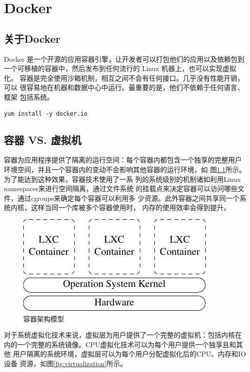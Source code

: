\chapter{Docker}

\section{关于Docker}

Docker 是一个开源的应用容器引擎，让开发者可以打包他们的应用以及依赖包到
一个可移植的容器中，然后发布到任何流行的 Linux 机器上，也可以实现虚拟化。
容器是完全使用沙箱机制，相互之间不会有任何接口。几乎没有性能开销，可以
很容易地在机器和数据中心中运行。最重要的是，他们不依赖于任何语言、框架
包括系统。

\begin{verbatim}
yum install -y docker.io
\end{verbatim}

\section{容器 VS. 虚拟机}

容器为应用程序提供了隔离的运行空间：每个容器内都包含一个独享的完整用户
环境空间，并且一个容器内的变动不会影响其他容器的运行环境，如
图\ref{fig:container}所示。为了能达到这种效果，容器技术使用了一系
列的系统级别的机制诸如利用Linux namespaces来进行空间隔离，通过文件系统
的挂载点来决定容器可以访问哪些文件，通过cgroups来确定每个容器可以利用多
少资源。此外容器之间共享同一个系统内核，这样当同一个库被多个容器使用时，
内存的使用效率会得到提升。

\begin{figure}[!htbp]
  \centering
  \includegraphics{graph/container01.pdf}
    \caption{容器架构模型}
  \label{fig:container}
\end{figure}

对于系统虚拟化技术来说，虚拟层为用户提供了一个完整的虚拟机：包括内核在
内的一个完整的系统镜像。CPU虚拟化技术可以为每个用户提供一个独享且和其他
用户隔离的系统环境，虚拟层可以为每个用户分配虚拟化后的CPU、内存和IO设备
资源，如图\ref{fig:virtualization}所示。

